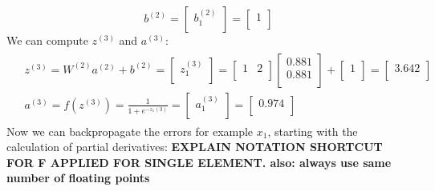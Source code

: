\documentclass[leqno]{article}
\begin{document}
\[
b^{(2)} =
   \begin{bmatrix}
  b_1^{(2)} \\
  \end{bmatrix}
  =
  \begin{bmatrix}
  1 \\
  \end{bmatrix}
\]
We can compute $z^{(3)}$ and $a^{(3)}$:
\begin{gather*}
\begin{split}
&z^{(3)} = W^{(2)}a^{(2)} + b^{(2)} =
 \begin{bmatrix}
  z_1^{(3)}\\
 \end{bmatrix}
 =
 \begin{bmatrix}
   1 & 2\\
  \end{bmatrix}
 \begin{bmatrix}
   0.881\\
   0.881\\ 
  \end{bmatrix} 
  +
   \begin{bmatrix}
   1\\
  \end{bmatrix}
  =
 \begin{bmatrix}
   3.642\\ 
  \end{bmatrix}
\\
&a^{(3)} = f(z^{(3)}) = \frac{1}{1 + e^{-z_1{(3)}}} =
 \begin{bmatrix}
   a_1^{(3)}\\ 
  \end{bmatrix}
 =
 \begin{bmatrix}
   0.974\\ 
  \end{bmatrix}
\end{split}
\end{gather*}
Now we can backpropagate the errors for example $x_1$, starting with the calculation of partial derivatives:
\textbf{EXPLAIN NOTATION SHORTCUT FOR F APPLIED FOR SINGLE ELEMENT. also: always use same number of floating points}
\end{document}
